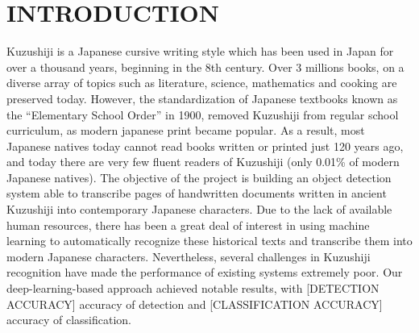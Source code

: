 \section{INTRODUCTION}
\label{sec:intro}

Kuzushiji is a Japanese cursive writing style which has been used in Japan for over a thousand years, beginning in the 8th century. Over 3 millions books, on a diverse array of topics such as literature, science, mathematics and cooking are preserved today. However, the standardization of Japanese textbooks known as the “Elementary School Order” in 1900, removed Kuzushiji from regular school curriculum, as modern japanese print became popular. As a result, most Japanese natives today cannot read books written or printed just 120 years ago, and today there are very few fluent readers of Kuzushiji (only 0.01\% of modern Japanese natives). The objective of the project is building an object detection system able to transcribe pages of handwritten documents written in ancient Kuzushiji into contemporary Japanese characters. Due to the lack of available human resources, there has been a great deal of interest in using machine learning to automatically recognize these historical texts and transcribe them into modern Japanese characters. Nevertheless, several challenges in Kuzushiji recognition have made the performance of existing systems extremely poor. Our deep-learning-based approach achieved notable results, with [DETECTION ACCURACY] accuracy of detection and [CLASSIFICATION ACCURACY] accuracy of classification.
